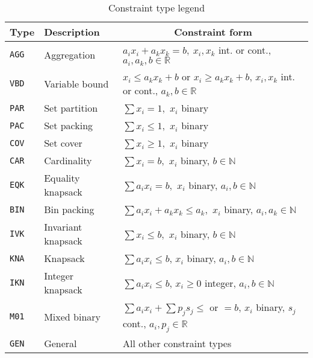 \begin{table}[h]
	\centering
	\caption{Constraint type legend \cite{MIPLIB}}
	\label{table:constraint_type}
	\begin{tabular}{@{}lll@{}}
		\toprule
		Type           & Description        & \multicolumn{1}{c}{Constraint form}                                                                                           \\ \midrule
		\texttt{AGG} & Aggregation        & $a_i x_i+a_k x_k=b,\ x_i , x_k$ int. or cont., $a_i , a_k , b \in \mathbb{R}$                  \\
		\texttt{VBD} & Variable bound     & $x_i \le a_k x_k + b$ or $x_i\ge a_k x_k + b$, $x_i, x_k$ int. or cont., $a_k, b\in\mathbb{R}$ \\
		\texttt{PAR} & Set partition      & $\sum x_i = 1,$ $x_i$ binary                                                                   \\
		\texttt{PAC} & Set packing        & $\sum x_i \le 1,$ $x_i$ binary                                                                 \\
		\texttt{COV} & Set cover          & $\sum x_i \ge 1,$ $x_i$ binary                                                                 \\
		\texttt{CAR} & Cardinality        & $\sum x_i = b,$ $x_i$ binary, $b\in\mathbb{N}$                                                 \\
		\texttt{EQK} & Equality knapsack  & $\sum a_i x_i = b,$ $x_i$ binary, $a_i , b\in\mathbb{N}$                                       \\
		\texttt{BIN} & Bin packing        & $\sum a_i x_i  + a_k x_k \le a_k,$ $x_i$ binary, $a_i , a_k\in\mathbb{N}$                      \\
		\texttt{IVK} & Invariant knapsack & $\sum x_i \le b,$ $x_i$ binary, $b\in\mathbb{N}$                                               \\
		\texttt{KNA} & Knapsack           & $\sum a_i x_i \le b$, $x_i$ binary, $a_i,b\in\mathbb{N}$                                            \\
		\texttt{IKN} & Integer knapsack   & $\sum a_i x_i \le b$, $x_i\ge 0$ integer, $a_i,b\in\mathbb{N}$                                      \\
		\texttt{M01} & Mixed binary       & $\sum a_i x_i + \sum p_j s_j \le$ or $=b$, $x_i$ binary, $s_j$ cont., $a_i, p_j\in\mathbb{R}$  \\
		\texttt{GEN} & General            & All other constraint types                                                                     \\ \bottomrule
	\end{tabular}
\end{table}